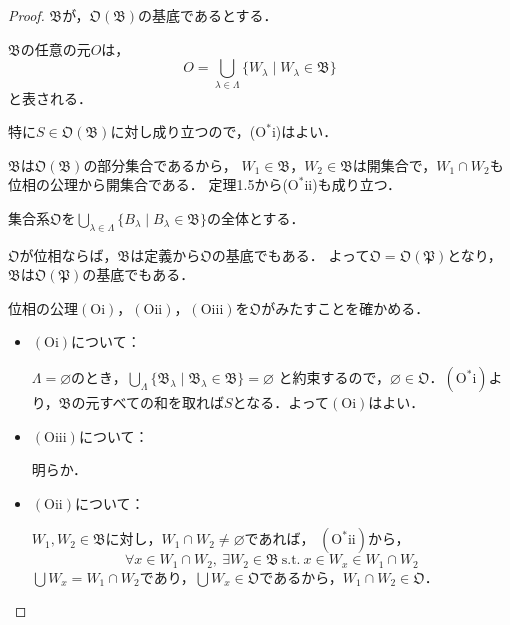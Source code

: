 \documentclass[dvipdfmx,uplatex,11pt]{jsarticle}
\begin{document}
\begin{leftbar}
    \begin{proof}
        $\mathfrak{B}$が，$\mathfrak{O}(\mathfrak{B})$の基底であるとする．

        $\mathfrak{B}$の任意の元$O$は，
        \[
            O = \bigcup_{\lambda \in \Lambda} \{ W_{\lambda} \mid W_{\lambda} \in \mathfrak{B}\} 
        \]
        と表される．

        特に$S \in \mathfrak{O}(\mathfrak{B})$に対し成り立つので，($\mathrm{O}^{\ast} \mathrm{i}$)はよい．

        $\mathfrak{B}$は$\mathfrak{O}(\mathfrak{B})$の部分集合であるから，
        $W_1 \in \mathfrak{B}$，$W_2 \in \mathfrak{B}$は開集合で，$W_1 \cap W_2$も位相の公理から開集合である．
        定理1.5から($\mathrm{O}^{\ast} \mathrm{ii}$)も成り立つ．

        集合系$\mathfrak{O}$を$\bigcup_{\lambda \in \Lambda} \{ B_\lambda \mid B_\lambda \in \mathfrak{B}\}$の全体とする．

        $\mathfrak{O}$が位相ならば，$\mathfrak{B}$は定義から$\mathfrak{O}$の基底でもある．
        よって$\mathfrak{O}= \mathfrak{O}(\mathfrak{P})$となり，$\mathfrak{B}$は$\mathfrak{O}(\mathfrak{P})$の基底でもある．

        位相の公理$(\mathrm{O} \mathrm{i})$，$(\mathrm{O} \mathrm{ii})$，$(\mathrm{O} \mathrm{iii})$を$\mathfrak{O}$がみたすことを確かめる．
        \begin{itemize}
            \item $(\mathrm{O} \mathrm{i})$について：
        
        $\Lambda = \varnothing$のとき，$\bigcup_{\Lambda} \{ \mathfrak{B}_{\lambda} \mid \mathfrak{B}_{\lambda} \in \mathfrak{B}\} = \varnothing$
            と約束するので，$\varnothing \in \mathfrak{O}$．$(\mathrm{O}^{\ast} \mathrm{i})$より，$\mathfrak{B}$の元すべての和を取れば$S$となる．よって$(\mathrm{O}\mathrm{i})$はよい．

            \item $(\mathrm{O} \mathrm{iii})$について：
            
            明らか．

            \item $(\mathrm{O} \mathrm{ii})$について：
            
            $W_1 , W_2 \in \mathfrak{B}$に対し，$W_1 \cap W_2 \ne \varnothing$であれば，
            $(\mathrm{O}^{\ast} \mathrm{ii})$から，
            \[
            \forall x \in W_1 \cap W_2 , ~ \exists W_2 \in \mathfrak{B} ~ \mathrm{s.t.} ~ x\in W_x \in W_1 \cap W_2
            \]
            $\bigcup W_x = W_1 \cap W_2$であり，$\bigcup W_x \in \mathfrak{O}$であるから，$W_1 \cap W_2 \in \mathfrak{O}$．


\end{itemize}
\end{proof}
\end{leftbar}
\end{document}
